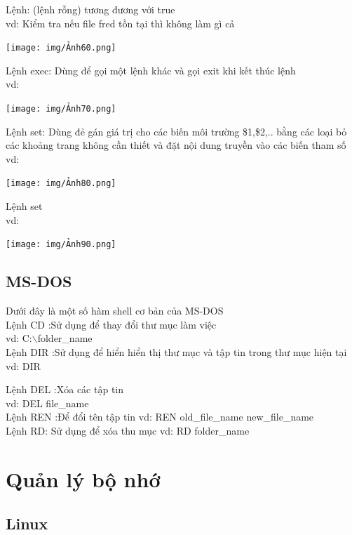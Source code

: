\documentclass[12pt,a4paper]{article}
\begin{document}
Lệnh: (lệnh rỗng) tương đương với true\\
vd: Kiểm tra nếu file fred tồn tại thì không làm gì cả\\
\begin{center}
	\texttt{[image: img/Ảnh60.png]}
\end{center}
Lệnh exec: Dùng để gọi một lệnh khác và gọi exit khi kết thúc lệnh\\
vd:\\
\begin{center}
	\texttt{[image: img/Ảnh70.png]}
\end{center}
Lệnh set: Dùng đẻ gán giá trị cho các biến môi trường \$1,\$2,.. bằng các loại bỏ các khoảng trang không cần thiết và đặt nội dung truyền vào các biến tham số \\
vd: \\
\begin{center}
	\texttt{[image: img/Ảnh80.png]}
\end{center}
Lệnh set\\
vd:\\
\begin{center}
	\texttt{[image: img/Ảnh90.png]}
\end{center}
\subsection{MS-DOS}
Dưới đây là một số hàm shell cơ bản của MS-DOS\\

Lệnh CD :Sử dụng để thay đổi thư mục làm việc\\
vd: C:$\backslash$folder\_name \\

Lệnh DIR :Sử dụng để hiển hiển thị thư mục và tập tin trong thư mục hiện tại\\
vd: DIR

Lệnh DEL :Xóa các tập tin\\
vd: DEL file\_name\\

Lệnh REN :Để đổi tên tập tin
vd: REN old\_file\_name new\_file\_name\\

Lệnh RD: Sử dụng để xóa thu mục
vd: RD folder\_name

\section{Quản lý bộ nhớ}
\subsection{Linux}
\end{document}
